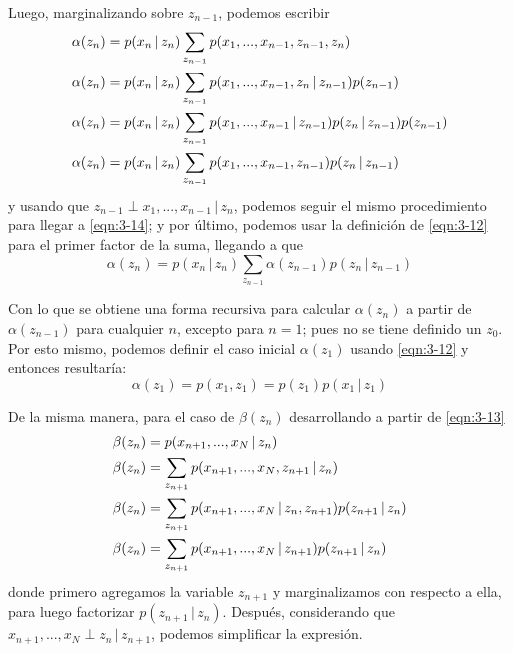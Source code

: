 Luego, marginalizando sobre $z_{n-1}$, podemos escribir
\begin{align}  
  \alpha(z_n) &= p(x_n \,|\, z_n) \sum_{z_{n-1}} 
    p(x_1, ..., x_{n-1}, z_{n-1}, z_n) 
    \notag \\ 
  \alpha(z_n) &= p(x_n \,|\, z_n) \sum_{z_{n-1}} 
    p(x_1, ..., x_{n-1}, z_n \,|\, z_{n-1}) p(z_{n-1})
    \notag \\ 
  \alpha(z_n) &= p(x_n \,|\, z_n) \sum_{z_{n-1}} 
    p(x_1, ..., x_{n-1} \,|\, z_{n-1}) p(z_n \,|\, z_{n-1}) p(z_{n-1})
    \notag \\ 
  \alpha(z_n) &= p(x_n \,|\, z_n) \sum_{z_{n-1}} 
    p(x_1, ..., x_{n-1}, z_{n-1}) p(z_n \,|\, z_{n-1})
    \label{eqn:3-14}
\end{align}
y usando que $z_{n-1} \perp x_1, ... , x_{n-1} \,|\, z_n$, podemos seguir el mismo procedimiento para llegar a \eqref{eqn:3-14}; y por último, podemos usar la definición de \eqref{eqn:3-12} para el primer factor de la suma, llegando a que
\begin{equation}
  \alpha(z_n) = p(x_n \,|\, z_n) \sum_{z_{n-1}} 
    \alpha(z_{n-1}) p(z_n \,|\, z_{n-1})
    \label{eqn:3-15}
\end{equation}

Con lo que se obtiene una forma recursiva para calcular $\alpha(z_n)$ a partir de $\alpha(z_{n-1})$ para cualquier $n$, excepto para $n = 1$; pues no se tiene definido un $z_0$. Por esto mismo, podemos definir el caso inicial $\alpha(z_1)$ usando \eqref{eqn:3-12} y entonces resultaría:
\begin{equation}
  \alpha(z_1) = p(x_1, z_1) = p(z_1) p(x_1 \,|\, z_1) 
  \label{eqn:3-16}
\end{equation}

De la misma manera, para el caso de $\beta(z_n)$ desarrollando a partir de  \eqref{eqn:3-13}
\begin{align}
  \beta(z_n) &= p(x_{n+1}, ..., x_N \,|\, z_n)
    \notag \\
  \beta(z_n) &= \sum_{z_{n+1}} p(x_{n+1}, ..., x_N, z_{n+1} \,|\, z_n)
    \notag \\
  \beta(z_n) &= \sum_{z_{n+1}} p(x_{n+1}, ..., x_N \,|\, z_n, z_{n+1}) 
    p(z_{n+1} \,|\, z_n)
    \notag \\
  \beta(z_n) &= \sum_{z_{n+1}} p(x_{n+1}, ..., x_N \,|\, z_{n+1}) 
    p(z_{n+1} \,|\, z_n)  
    \notag 
\end{align}
donde primero agregamos la variable $z_{n+1}$ y marginalizamos con respecto a ella, para luego factorizar $p(z_{n+1} \,|\, z_n)$. Después, considerando que 
$x_{n+1}, ..., x_N \perp z_n \,|\, z_{n+1}$, podemos simplificar la expresión.

